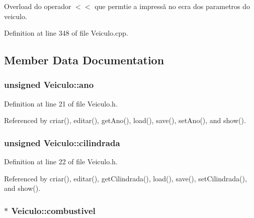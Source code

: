 Overload do operador $<$$<$ que permtie a impressã no ecra dos parametros do veiculo. 



Definition at line 348 of file Veiculo.\+cpp.



\subsection{Member Data Documentation}
\hypertarget{class_veiculo_ae141824a9353b3f7ed99d5c34c830fe2}{
\subsubsection[{ano}]{\setlength{\rightskip}{0pt plus 5cm}unsigned Veiculo\+::ano\hspace{0.3cm}{\ttfamily [private]}}}\label{class_veiculo_ae141824a9353b3f7ed99d5c34c830fe2}


Definition at line 21 of file Veiculo.\+h.



Referenced by criar(), editar(), get\+Ano(), load(), save(), set\+Ano(), and show().

\hypertarget{class_veiculo_a3c3b3f2f958a98b48fa5e4f46007c9f9}{
\subsubsection[{cilindrada}]{\setlength{\rightskip}{0pt plus 5cm}unsigned Veiculo\+::cilindrada\hspace{0.3cm}{\ttfamily [private]}}}\label{class_veiculo_a3c3b3f2f958a98b48fa5e4f46007c9f9}


Definition at line 22 of file Veiculo.\+h.



Referenced by criar(), editar(), get\+Cilindrada(), load(), save(), set\+Cilindrada(), and show().

\hypertarget{class_veiculo_ad8416cc9da449baed5e07ed146572712}{
\subsubsection[{combustivel}]{$\ast$ Veiculo\+::combustivel\hspace{0.3cm}{\ttfamily [private]}}}\label{class_veiculo_ad8416cc9da449baed5e07ed146572712}


